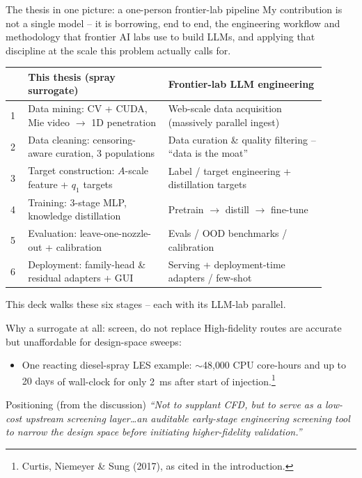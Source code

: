 \documentclass[aspectratio=169,11pt]{beamer}
\newcommand{\good}[1]{\textcolor{goodGreen}{#1}}
\newcommand{\warn}[1]{\textcolor{warnRed}{#1}}
\newcommand{\blue}[1]{\textcolor{aaltoBlue}{#1}}
\begin{document}
\begin{frame}{The thesis in one picture: a one-person frontier-lab pipeline}
\footnotesize
My contribution is not a single model -- it is borrowing, end to end, the
\blue{engineering workflow and methodology} that frontier AI labs use to build LLMs,
and applying that discipline at the scale this problem actually calls for.
\medskip

\begin{center}
\renewcommand{\arraystretch}{1.04}
\begin{tabular}{L{0.05\linewidth} L{0.40\linewidth} L{0.45\linewidth}}
\toprule
 & \textbf{This thesis (spray surrogate)} & \textbf{\blue{Frontier-lab LLM engineering}} \\
 & Data mining: CV + CUDA, Mie video $\to$ 1D penetration & Web-scale data acquisition (massively parallel ingest) \\
2 & Data cleaning: censoring-aware curation, 3 populations & Data curation \& quality filtering -- ``data is the moat'' \\
3 & Target construction: $A$-scale feature + $q_1$ targets & Label / target engineering + distillation targets \\
4 & Training: 3-stage MLP, knowledge distillation & Pretrain $\to$ distill $\to$ fine-tune \\
5 & Evaluation: leave-one-nozzle-out + calibration & Evals / OOD benchmarks / calibration \\
6 & Deployment: family-head \& residual adapters + GUI & Serving + deployment-time adapters / few-shot \\
\bottomrule
\end{tabular}
\end{center}
\smallskip
\begin{center}\small\blue{This deck walks these six stages -- each with its LLM-lab parallel.}\end{center}
\end{frame}


\begin{frame}{Why a surrogate at all: screen, do not replace}
\small
High-fidelity routes are accurate but unaffordable for design-space sweeps:
\begin{itemize}
  \item One reacting diesel-spray LES example: \warn{$\sim$48{,}000 CPU core-hours and up to 20 days} of wall-clock for only \warn{\SI{2}{ms}} after start of injection.\footnote{\tiny Curtis, Niemeyer \& Sung (2017), as cited in the introduction.}
\end{itemize}
\medskip
\begin{block}{Positioning (from the discussion)}
\emph{``Not to supplant CFD, but to serve as a low-cost upstream screening layer\ldots an
auditable early-stage engineering screening tool to \good{narrow the design space} before
initiating higher-fidelity validation.''}
\end{block}
\end{frame}
\end{document}
